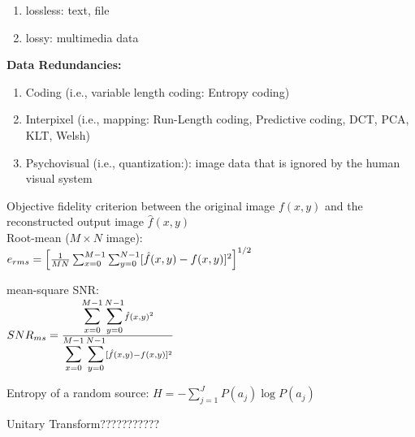 \documentclass{../cheat}
\begin{document}
\begin{multicols}{3}
	\begin{enumerate}
		\item lossless: text, file
		\item lossy: multimedia data
	\end{enumerate}
	\textbf{Data Redundancies:}
	\begin{enumerate}
		\item Coding (i.e., variable length coding: Entropy coding)
		\item Interpixel (i.e., mapping: Run-Length coding, Predictive coding, DCT, PCA, KLT, Welsh)
		\item Psychovisual (i.e., quantization:): image data that is ignored by the human visual system
	\end{enumerate}
	Objective fidelity criterion between the original image $ f(x,y) $ and the reconstructed output image $ \hat{f}(x,y) $\\
	Root-mean ($ M \times N $ image):\\
	$e_{rms} = \left[ {1 \over MN} \sum_{x=0}^{M-1} \sum_{y=0}^{N-1} [\hat{f}(x,y) - f(x,y) ]^2 \right]^{1/2}$
	
	mean-square SNR:\\
	$SNR_{ms} = { {\displaystyle \sum_{x=0}^{M-1} \sum_{y=0}^{N-1}} \hat{f} (x,y)^2 \over {\displaystyle \sum_{x=0}^{M-1} \sum_{y=0}^{N-1}} [\hat{f}(x,y)- f(x,y)]^2 }$

	Entropy of a random source:
	$H = - \sum_{j=1}^J P(a_j) \log P(a_j)$

	Unitary Transform???????????
	

\end{multicols}
\end{document}
